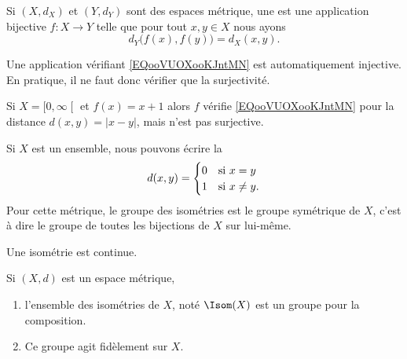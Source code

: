 \begin{definition}
    Si \( (X,d_X)\) et \( (Y,d_Y)\) sont des espaces métrique, une  est une application bijective \( f\colon X\to Y\) telle que pour tout \( x,y\in X\) nous ayons
    \begin{equation}        \label{EQooVUOXooKJntMN}
        d_Y\big( f(x),f(y) \big)=d_X(x,y).
    \end{equation}
\end{definition}

\begin{remark}
    Une application vérifiant \eqref{EQooVUOXooKJntMN} est automatiquement injective. En pratique, il ne faut donc vérifier que la surjectivité. 
\end{remark}

\begin{example}
    Si \( X=\mathopen[ 0 , \infty \mathclose[\) et \( f(x)=x+1\) alors \( f\) vérifie \eqref{EQooVUOXooKJntMN} pour la distance \( d(x,y)=| x-y |\), mais n'est pas surjective.
\end{example}

\begin{example}
    Si \( X\) est un ensemble, nous pouvons écrire la 
    \begin{equation}
        d(x,y)=\begin{cases}
            0    &   \text{si \( x=y\)}\\
            1    &    \text{si \( x\neq y\).}
        \end{cases}
    \end{equation}
    Pour cette métrique, le groupe des isométries est le groupe symétrique de \( X\), c'est à dire le groupe de toutes les bijections de \( X\) sur lui-même.
\end{example}

\begin{proposition}
    Une isométrie est continue.
\end{proposition}

\begin{propositionDef}
    Si \( (X,d)\) est un espace métrique, 
    \begin{enumerate}
        \item
            l'ensemble des isométries de \( X\), noté \( \Isom(X)\) est un groupe pour la composition.
        \item
            Ce groupe agit fidèlement sur \( X\).
    \end{enumerate}
\end{propositionDef}

